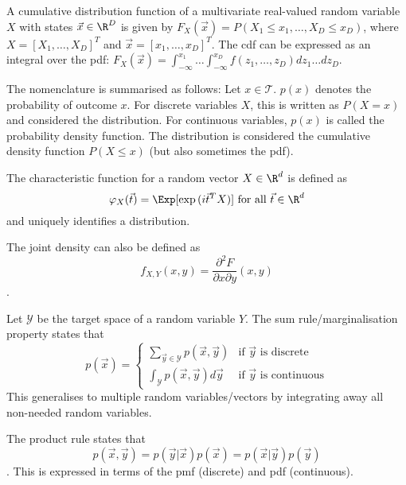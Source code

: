 A cumulative distribution function of a multivariate real-valued
random variable $X$ with states $\vec{x} \in \R^D$ is
given by
$F_X(\vec{x}) = P(X_1 \leq x_1, \dotsc, X_D \leq x_D)$,
where $X = [X_1, \dotsc, X_D]^T$ and $\vec{x} = [x_1, \dotsc, x_D]^T$.
The cdf can be expressed as an integral over the pdf:
$F_X(\vec{x}) = \int_{-\infty}^{x_1}{\dots \int_{-\infty}^{x_D}{f(z_1, \dotsc, z_D) dz_1 \dots dz_D}}$.

The nomenclature is summarised as follows:
Let $x \in \mathcal{T}$. $p(x)$ denotes the probability of outcome $x$.
For discrete variables $X$, this is written as $P(X = x)$ and
considered the distribution.
For continuous variables, $p(x)$ is called the probability density function.
The distribution is considered the cumulative density function $P(X \leq x)$ (but also sometimes the pdf).

The characteristic function for a random vector $X \in \R^d$ is defined as
\begin{equation*}
    \varphi_X(\vec{t}) = \Exp[\exp{(i \vec{t}^T X)}] \text{ for all $\vec{t} \in \R^d$}
\end{equation*}
and uniquely identifies a distribution.

The joint density can also be defined as
\begin{equation*}
    f_{X, Y}(x, y) =
        \frac{\partial^2 F}{\partial x \partial y}(x, y)
\end{equation*}.

Let $\mathcal{Y}$ be the target space of a random variable $Y$.
The sum rule/marginalisation property states that
\begin{equation*}
    p(\vec{x}) =
    \begin{cases}
        \sum_{\vec{y} \in \mathcal{Y}}{p(\vec{x}, \vec{y})} & \text{if $\vec{y}$ is discrete} \\
        \int_\mathcal{Y}{p(\vec{x}, \vec{y}) d\vec{y}} & \text{if $\vec{y}$ is continuous}
    \end{cases}
\end{equation*}
This generalises to multiple random variables/vectors by integrating
away all non-needed random variables.

The product rule states that
\begin{equation*}
    p(\vec{x}, \vec{y})
    = p(\vec{y} | \vec{x}) p(\vec{x})
    = p(\vec{x} | \vec{y}) p(\vec{y})
\end{equation*}.
This is expressed in terms of the pmf (discrete) and pdf (continuous).

